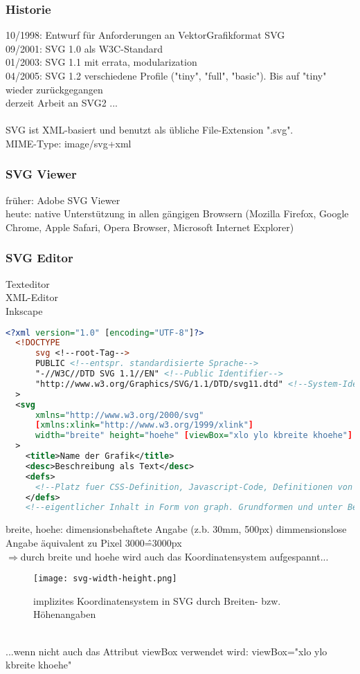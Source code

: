 \subsubsection{Historie}
10/1998: Entwurf für Anforderungen an VektorGrafikformat SVG\\
09/2001: SVG 1.0 als W3C-Standard\\
01/2003: SVG 1.1 mit errata, modularization\\
04/2005: SVG 1.2 verschiedene Profile ("tiny", "full", "basic"). Bis auf "tiny" wieder zurückgegangen\\
derzeit Arbeit an SVG2 ...\\
\\
SVG ist XML-basiert und benutzt als übliche File-Extension ".svg".\\
MIME-Type: image/svg+xml\\
\subsubsection{SVG Viewer}
früher: Adobe SVG Viewer\\
heute: native Unterstützung in allen gängigen Browsern (Mozilla Firefox, Google Chrome, Apple Safari, Opera Browser, Microsoft Internet Explorer)
\subsubsection{SVG Editor}
Texteditor\\
XML-Editor\\
Inkscape\\
\begin{lstlisting}[caption={Grundgerüst einer SVG-Datei}, label={lst:Grundger:SVG}, language={XML}]
  <?xml version="1.0" [encoding="UTF-8"]?>
  <!DOCTYPE 
      svg <!--root-Tag-->
      PUBLIC <!--entspr. standardisierte Sprache-->
      "-//W3C//DTD SVG 1.1//EN" <!--Public Identifier-->
      "http://www.w3.org/Graphics/SVG/1.1/DTD/svg11.dtd" <!--System-Identifier-->
  >
  <svg
      xmlns="http://www.w3.org/2000/svg"
      [xmlns:xlink="http://www.w3.org/1999/xlink"]
      width="breite" height="hoehe" [viewBox="xlo ylo kbreite khoehe"]
  >
    <title>Name der Grafik</title>
    <desc>Beschreibung als Text</desc>
    <defs>
      <!--Platz fuer CSS-Definition, Javascript-Code, Definitionen von graph Objekten, welche zunaechst nicht angezeigt werden-->
    </defs>
    <!--eigentlicher Inhalt in Form von graph. Grundformen und unter Benutzung von komplexen (auch ind <defs> definierten) graph. Objekten-->
\end{lstlisting}
breite, hoehe: dimensionsbehaftete Angabe (z.b. 30mm, 500px) dimmensionslose Angabe äquivalent zu Pixel 3000\^=3000px\\
$\Rightarrow$durch breite und hoehe wird auch das Koordinatensystem aufgespannt...
\begin{figure}[h]
  \centering
  \texttt{[image: svg-width-height.png]}
  \caption{implizites Koordinatensystem in SVG durch Breiten- bzw. Höhenangaben}
\end{figure}\\
...wenn nicht auch das Attribut viewBox verwendet wird: viewBox="xlo ylo kbreite khoehe"
